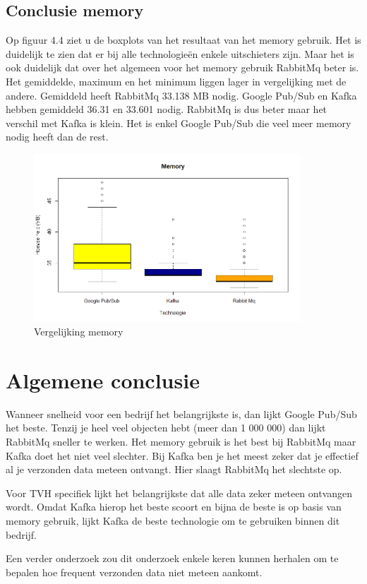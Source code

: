 \subsection{Conclusie memory}

Op figuur 4.4 ziet u de boxplots van het resultaat van het memory gebruik. Het is duidelijk te zien dat er bij alle technologieën enkele uitschieters zijn. Maar het is ook duidelijk dat over het algemeen voor het memory gebruik RabbitMq beter is. Het gemiddelde, maximum en het minimum liggen lager in vergelijking met de andere. Gemiddeld heeft RabbitMq 33.138 MB nodig. Google Pub/Sub en Kafka hebben gemiddeld 36.31 en 33.601 nodig. RabbitMq is dus beter maar het verschil met Kafka is klein. Het is enkel Google Pub/Sub die veel meer memory nodig heeft dan de rest.
\begin{figure}[h!]
    \centering
    \includegraphics[width=100mm]{../memory.png}
    \caption{Vergelijking memory}
    
\end{figure}



\section{Algemene conclusie}
Wanneer snelheid voor een bedrijf het belangrijkste is, dan lijkt Google Pub/Sub het beste. Tenzij je heel veel objecten hebt (meer dan 1 000 000) dan lijkt RabbitMq sneller te werken. Het memory gebruik is het best bij RabbitMq maar Kafka doet het niet veel slechter. Bij Kafka ben je het meest zeker dat je effectief al je verzonden data meteen ontvangt. Hier slaagt RabbitMq het slechtste op.

Voor TVH specifiek lijkt het belangrijkste dat alle data zeker meteen ontvangen wordt. Omdat Kafka hierop het beste scoort en bijna de beste is op basis van memory gebruik, lijkt Kafka de beste technologie om te gebruiken binnen dit bedrijf.

Een verder onderzoek zou dit onderzoek enkele keren kunnen herhalen om te bepalen hoe frequent verzonden data niet meteen aankomt. 

